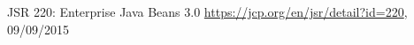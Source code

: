 %
%
\begin{thebibliography}{100}
	
	 JSR 220: Enterprise Java Beans 3.0
	\url{https://jcp.org/en/jsr/detail?id=220}, 09/09/2015
	
\end{thebibliography}